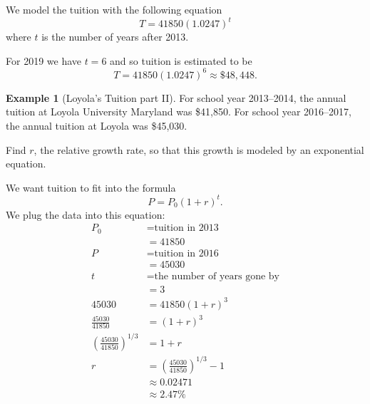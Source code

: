 \documentclass[oneside]{book}
\theoremstyle{definition}
\newtheorem{example}{Example}
\theoremstyle{solution}
\newtheorem*{solution}{Solution}
\newenvironment{solution}{\vspace{2in}\comment}{\endcomment}
\begin{document}
\begin{solution}
We model the tuition with the following equation
$$
T = 41850 (1.0247)^t
$$
where $t$ is the number of years after 2013.  

For 2019 we  have $t=6$ and so tuition is estimated to be
$$
T = 41850 (1.0247)^6 \approx \$48,448.
$$

\end{solution}


\begin{example}[Loyola's Tuition part II]
  For school year 2013--2014, the annual tuition at Loyola University
  Maryland was \$41,850.  For school year 2016--2017, the annual
  tuition at Loyola was \$45,030.   
\bigskip

  Find $r$, the relative growth rate, so that this growth is modeled
  by an exponential equation.
\end{example}

\begin{solution}
We want tuition to fit into the formula
$$
P = P_0(1+r)^t.
$$
We plug the data into this equation:
\begin{align*}
P_0 & = \text{tuition in 2013}\\
 & = 41850\\
P & = \text{tuition in 2016}\\
 & = 45030\\
t & = \text{the number of years gone by}\\
  & = 3\\
45030 & = 41850 (1+r)^3\\
\frac{45030}{41850} & = (1+r)^3\\
\left(\frac{45030}{41850}\right)^{1/3} & = 1+r\\
r & = \left(\frac{45030}{41850}\right)^{1/3} -1\\
 & \approx 0.02471\\
 & \approx 2.47\%
\end{align*}
\end{solution}
\end{document}
